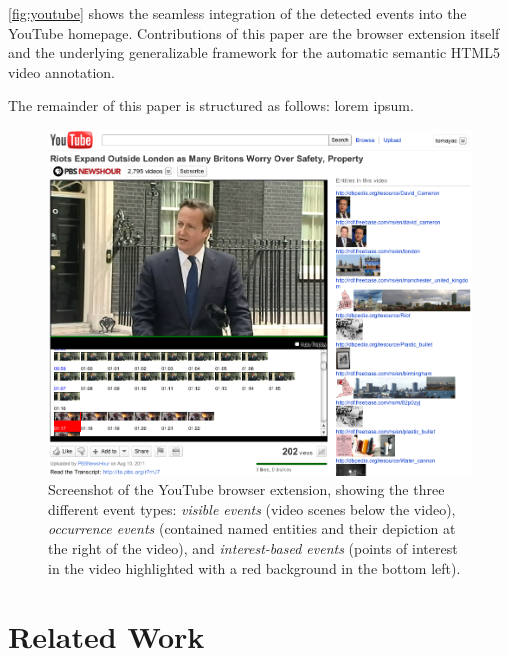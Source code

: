 \documentclass[runningheads,a4paper]{llncs}
\begin{document}
\autoref{fig:youtube} shows the seamless integration of the detected events into the YouTube homepage. Contributions of this paper are the browser extension itself and the underlying generalizable framework for the automatic semantic HTML5 video annotation.

The remainder of this paper is structured as follows: lorem ipsum.

\begin{figure}
\begin{center}
   \includegraphics[width=0.8\linewidth]{./resources/youtube}
\end{center}
   \caption{Screenshot of the YouTube browser extension, showing the three different event types: \emph{visible events} (video scenes below the video), \emph{occurrence events} (contained named entities and their depiction at the right of the video), and \emph{interest-based events} (points of interest in the video highlighted with a red background in the bottom left).}
\label{fig:youtube}
\end{figure}


\section{Related Work} \label{sec:related-work}

\end{document}
